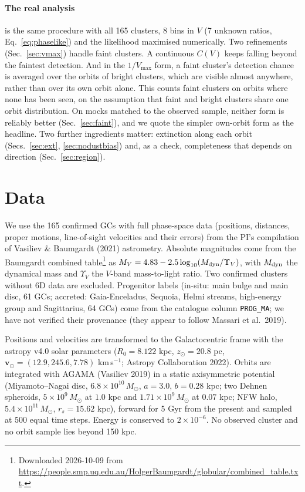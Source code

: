 \documentclass[11pt,a4paper]{article}
\newcommand{\MV}{M_V}
\begin{document}
\paragraph{The real analysis} is the same procedure with all 165 clusters, 8 bins in $V$ (7 unknown
ratios, Eq.~\ref{eq:phaselike}) and the likelihood maximised numerically. Two refinements
(Sec.~\ref{sec:vmax}) handle faint clusters. A continuous $C(V)$ keeps falling beyond the faintest
detection. And in the $1/V_{\max}$ form, a faint cluster's detection chance is averaged over the
orbits of bright clusters, which are visible almost anywhere, rather than over its own orbit alone.
This counts faint clusters on orbits where none has been seen, on the assumption that faint and
bright clusters share one orbit distribution. On mocks matched to the observed sample, neither form
is reliably better (Sec.~\ref{sec:faint}), and we quote the simpler own-orbit form as the headline.
Two further ingredients matter: extinction along each orbit (Secs.~\ref{sec:ext}, \ref{sec:nodustbias})
and, as a check, completeness that depends on direction (Sec.~\ref{sec:region}).

\section{Data}
\label{sec:data}

We use the 165 confirmed GCs with full phase-space data (positions, distances, proper motions,
line-of-sight velocities and their errors) from the PI's compilation of Vasiliev \& Baumgardt (2021)
astrometry. Absolute magnitudes come from the Baumgardt combined table\footnote{Downloaded
2026-10-09 from \url{https://people.smp.uq.edu.au/HolgerBaumgardt/globular/combined_table.txt}.} as
$\MV = 4.83 - 2.5\log_{10}(M_{\rm dyn}/\Upsilon_V)$, with $M_{\rm dyn}$ the dynamical mass and
$\Upsilon_V$ the $V$-band mass-to-light ratio. Two confirmed clusters without 6D data are excluded.
Progenitor labels (in-situ: main bulge and main disc, 61 GCs; accreted: Gaia-Enceladus, Sequoia,
Helmi streams, high-energy group and Sagittarius, 64 GCs) come from the catalogue column
\texttt{PROG\_MA}; we have not verified their provenance (they appear to follow Massari et al.\ 2019).

Positions and velocities are transformed to the Galactocentric frame with the astropy v4.0 solar
parameters ($R_0 = 8.122$ kpc, $z_\odot = 20.8$ pc, $\boldsymbol v_\odot = (12.9, 245.6, 7.78)$
km\,s$^{-1}$; Astropy Collaboration 2022). Orbits are integrated with AGAMA (Vasiliev 2019) in a
static axisymmetric potential (Miyamoto--Nagai disc, $6.8\times10^{10}\,M_\odot$, $a=3.0$, $b=0.28$
kpc; two Dehnen spheroids, $5\times10^{9}\,M_\odot$ at $1.0$ kpc and $1.71\times10^{9}\,M_\odot$ at
$0.07$ kpc; NFW halo, $5.4\times10^{11}\,M_\odot$, $r_s = 15.62$ kpc), forward for 5 Gyr from the
present and sampled at 500 equal time steps. Energy is conserved to $2\times10^{-6}$. No observed
cluster and no orbit sample lies beyond 150 kpc.
\end{document}
